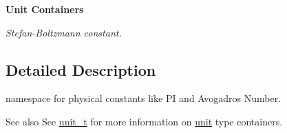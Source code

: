 \begin{Indent}{\bf Unit Containers}
\begin{DoxyCompactItemize}
\begin{DoxyCompactList}\small\item\em Stefan-\/\+Boltzmann constant. \end{DoxyCompactList}\end{DoxyCompactItemize}
\end{Indent}


\subsection{Detailed Description}
namespace for physical constants like P\+I and Avogadro\textquotesingle{}s Number. 

\begin{DoxySeeAlso}{See also}
See \hyperlink{classunits_1_1unit__t}{unit\+\_\+t} for more information on \hyperlink{structunits_1_1unit}{unit} type containers. 
\end{DoxySeeAlso}
